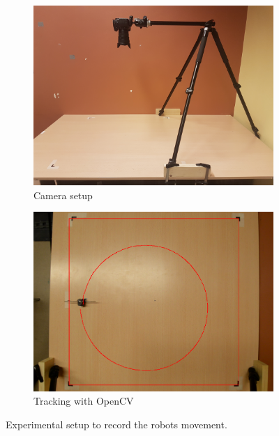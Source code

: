 \begin{figure}
	\centering
	\begin{subfigure}[b]{0.45\textwidth}
		\includegraphics[width=\textwidth]{pics/movement_setup.jpg}
		\caption{Camera setup}
	\end{subfigure}
	\quad
	\begin{subfigure}[b]{0.45\textwidth}
		\includegraphics[width=\textwidth]{pics/movement_example.png}
		\caption{Tracking with OpenCV}
		\label{fig:movement_example}
	\end{subfigure}
	\caption{Experimental setup to record the robots movement.}
	\label{fig:movement_setup}
\end{figure}

